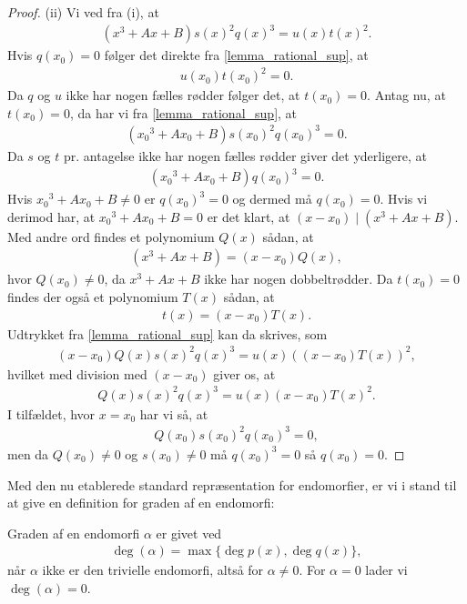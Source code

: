 \begin{proof}
(ii) Vi ved fra (i), at 
\begin{align}
	\label{lemma_rational_sup}
	(x^3 + Ax + B)s(x)^2 q(x)^3 = u(x) t(x)^2.
\end{align}
Hvis $q(x_0) = 0$ følger det direkte fra \eqref{lemma_rational_sup}, at 
\begin{align*}
	u(x_0)t(x_0)^2 = 0.
\end{align*}
Da $q$ og $u$ ikke har nogen fælles rødder følger det, at $t(x_0) = 0$. Antag nu, at $t(x_0)=0$, da har vi fra
\eqref{lemma_rational_sup}, at
\begin{align*}
	({x_0}^3 + Ax_0 + B)s(x_0)^2 q(x_0)^3 = 0.
\end{align*}
Da $s$ og $t$ pr. antagelse ikke har nogen fælles rødder giver det yderligere, at 
\begin{align*}
	({x_0}^3 + Ax_0 + B)q(x_0)^3 = 0.
\end{align*}
Hvis ${x_0}^3 + Ax_0 + B \neq 0$ er $q(x_0)^3 = 0$ og dermed må $q(x_0) = 0$. Hvis vi derimod har, at 
${x_0}^3 + Ax_0 + B = 0$ er det klart, at $(x-x_0) \mid (x^3 + Ax + B)$. Med andre ord findes et polynomium $Q(x)$ sådan, at
\begin{align*}
	(x^3 + Ax + B) = (x-x_0)Q(x),
\end{align*}
hvor $Q(x_0) \neq 0$, da $x^3 + Ax + B$ ikke har nogen dobbeltrødder. Da $t(x_0)=0$ findes der også et polynomium $T(x)$ sådan, at
\begin{align*}
	t(x) = (x-x_0)T(x).
\end{align*}
Udtrykket fra \eqref{lemma_rational_sup} kan da skrives, som
\begin{align*}
	(x-x_0)Q(x)s(x)^2q(x)^3 = u(x) ((x-x_0)T(x))^2,
\end{align*}
hvilket med division med $(x-x_0)$ giver os, at
\begin{align*}
	Q(x)s(x)^2 q(x)^3 =  u(x) (x-x_0) T(x)^2.
\end{align*}
I tilfældet, hvor $x=x_0$ har vi så, at
\begin{align*}
	Q(x_0)s(x_0)^2q(x_0)^3 = 0,
\end{align*}
men da $Q(x_0) \neq 0$ og $s(x_0) \neq 0$ må $q(x_0)^3 = 0$ så $q(x_0)=0$.
\end{proof}

Med den nu etablerede standard repræsentation for endomorfier, er vi i stand til at give en definition for graden af en endomorfi:

\begin{definition}
Graden af en endomorfi $\alpha$ er givet ved
\begin{align*}
	\deg(\alpha) = \max \{ \deg p(x), \deg q(x) \},
\end{align*}
når $\alpha$ ikke er den trivielle endomorfi, altså for $\alpha \neq 0$. For $\alpha = 0$ lader vi $\deg (\alpha) = 0$.
\end{definition}


